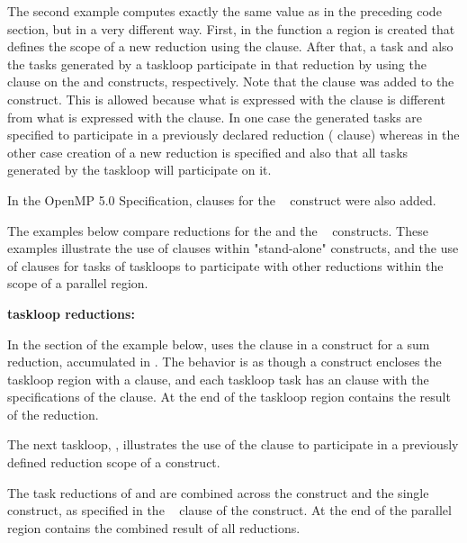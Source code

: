 The second example computes exactly the same value as in the preceding code section,
but in a very different way.
First, in the  function a  region is created 
that defines the scope of a new reduction using the  clause.
After that, a task and also the tasks generated by a taskloop participate in 
that reduction by using the  clause on the 
and  constructs, respectively. 
Note that the  clause was added to the  construct.
This is allowed because what is expressed with the  clause
is different from what is expressed with the  clause.
In one case the generated tasks are specified to participate in a previously 
declared reduction ( clause) whereas in the other case
creation of a new reduction is specified and also that all tasks generated 
by the taskloop will participate on it.


In the OpenMP 5.0 Specification,  clauses for the
~ construct were also added. 

The examples below compare reductions for the  and the ~ constructs.
These examples illustrate the use of  clauses within 
"stand-alone"  constructs, and the use of  clauses for tasks of taskloops to participate
with other reductions within the scope of a parallel region.

\textbf{taskloop reductions:}

In the  section of the example below, 
 uses the  clause 
in a  construct for a sum reduction, accumulated in . 
The behavior is as though a  construct encloses the 
taskloop region with a  clause, and each taskloop
task has an  clause with the specifications 
of the  clause.
At the end of the taskloop region  contains the result of the reduction.

The next taskloop, , illustrates the use of the 
 clause to participate in a previously defined
reduction scope of a  construct.

The task reductions of  and  are combined
across the  construct and the single  construct, as specified
in the ~ clause of the  construct.
At the end of the parallel region  contains the combined result of all reductions.

